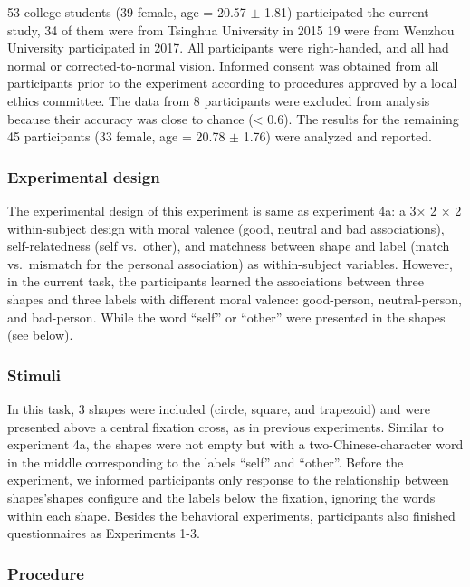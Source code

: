 \documentclass[
  english,
  man]{apa6}
\begin{document}
53 college students (39 female, age = 20.57 \(\pm\) 1.81) participated the current study, 34 of them were from Tsinghua University in 2015 19 were from Wenzhou University participated in 2017. All participants were right-handed, and all had normal or corrected-to-normal vision. Informed consent was obtained from all participants prior to the experiment according to procedures approved by a local ethics committee. The data from 8 participants were excluded from analysis because their accuracy was close to chance (\textless{} 0.6). The results for the remaining 45 participants (33 female, age = 20.78 \(\pm\) 1.76) were analyzed and reported.

\hypertarget{experimental-design-1}{%
\subsubsection{Experimental design}\label{experimental-design-1}}

The experimental design of this experiment is same as experiment 4a: a 3× 2 × 2 within-subject design with moral valence (good, neutral and bad associations), self-relatedness (self vs.~other), and matchness between shape and label (match vs.~mismatch for the personal association) as within-subject variables. However, in the current task, the participants learned the associations between three shapes and three labels with different moral valence: good-person, neutral-person, and bad-person. While the word \enquote{self} or \enquote{other} were presented in the shapes (see below).

\hypertarget{stimuli-2}{%
\subsubsection{Stimuli}\label{stimuli-2}}

In this task, 3 shapes were included (circle, square, and trapezoid) and were presented above a central fixation cross, as in previous experiments. Similar to experiment 4a, the shapes were not empty but with a two-Chinese-character word in the middle corresponding to the labels \enquote{self} and \enquote{other}. Before the experiment, we informed participants only response to the relationship between shapes'shapes configure and the labels below the fixation, ignoring the words within each shape. Besides the behavioral experiments, participants also finished questionnaires as Experiments 1-3.

\hypertarget{procedure-7}{%
\subsubsection{Procedure}\label{procedure-7}}
\end{document}

